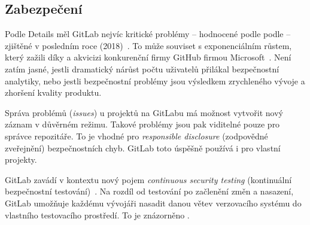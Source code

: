     \subsection{Zabezpečení}
        Podle  Details měl GitLab nejvíc kritické problémy -- hodnocené podle podle  -- zjištěné v posledním roce (2018)~\cite{cve-gitlab}. To může souviset s exponenciálním růstem, který zažili díky  a akvicizi konkurenční firmy GitHub firmou Microsoft~\cite{gitlab-growth}. Není zatím jasné, jestli dramatický nárůst počtu uživatelů přilákal bezpečnostní analytiky, nebo jestli bezpečnostní problémy jsou výsledkem zrychleného vývoje a zhoršení kvality produktu.


        Správa problémů (\textit{issues}) u projektů na GitLabu má možnost vytvořit nový záznam v důvěrném režimu. Takové problémy jsou pak viditelné pouze pro správce repozitáře. To je vhodné pro \textit{responsible disclosure} (zodpovědné zveřejnění) bezpečnostních chyb. GitLab toto úspěšně používá i pro vlastní projekty.

        GitLab zavádí v kontextu \CICD nový pojem \textit{continuous security testing} (kontinuální bezpečnostní testování)~\cite{gitlab-app-security}. Na rozdíl od testování po začlenění změn a nasazení, GitLab umožňuje každému vývojáři nasadit danou větev verzovacího systému do vlastního testovacího prostředí. To je znázorněno .

